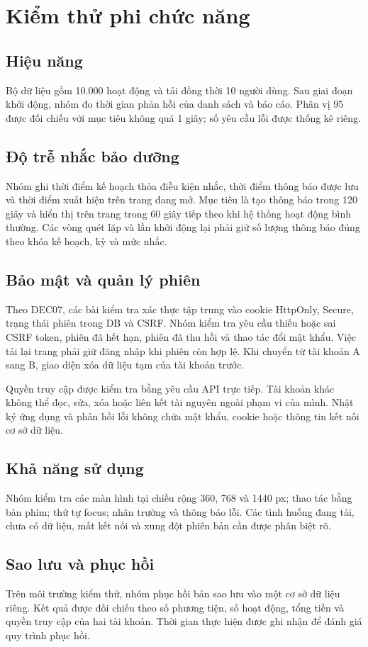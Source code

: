 \section{Kiểm thử phi chức năng}
\subsection{Hiệu năng}
Bộ dữ liệu gồm 10.000 hoạt động và tải đồng thời 10 người dùng. Sau giai đoạn khởi động, nhóm đo thời gian phản hồi của danh sách và báo cáo. Phân vị 95 được đối chiếu với mục tiêu không quá 1 giây; số yêu cầu lỗi được thống kê riêng.

\subsection{Độ trễ nhắc bảo dưỡng}
Nhóm ghi thời điểm kế hoạch thỏa điều kiện nhắc, thời điểm thông báo được lưu và thời điểm xuất hiện trên trang đang mở. Mục tiêu là tạo thông báo trong 120 giây và hiển thị trên trang trong 60 giây tiếp theo khi hệ thống hoạt động bình thường. Các vòng quét lặp và lần khởi động lại phải giữ số lượng thông báo đúng theo khóa kế hoạch, kỳ và mức nhắc.

\subsection{Bảo mật và quản lý phiên}
Theo DEC07, các bài kiểm tra xác thực tập trung vào cookie HttpOnly, Secure, trạng thái phiên trong DB và CSRF. Nhóm kiểm tra yêu cầu thiếu hoặc sai CSRF token, phiên đã hết hạn, phiên đã thu hồi và thao tác đổi mật khẩu. Việc tải lại trang phải giữ đăng nhập khi phiên còn hợp lệ. Khi chuyển từ tài khoản A sang B, giao diện xóa dữ liệu tạm của tài khoản trước.

Quyền truy cập được kiểm tra bằng yêu cầu API trực tiếp. Tài khoản khác không thể đọc, sửa, xóa hoặc liên kết tài nguyên ngoài phạm vi của mình. Nhật ký ứng dụng và phản hồi lỗi không chứa mật khẩu, cookie hoặc thông tin kết nối cơ sở dữ liệu.

\subsection{Khả năng sử dụng}
Nhóm kiểm tra các màn hình tại chiều rộng 360, 768 và 1440 px; thao tác bằng bàn phím; thứ tự focus; nhãn trường và thông báo lỗi. Các tình huống đang tải, chưa có dữ liệu, mất kết nối và xung đột phiên bản cần được phân biệt rõ.

\subsection{Sao lưu và phục hồi}
Trên môi trường kiểm thử, nhóm phục hồi bản sao lưu vào một cơ sở dữ liệu riêng. Kết quả được đối chiếu theo số phương tiện, số hoạt động, tổng tiền và quyền truy cập của hai tài khoản. Thời gian thực hiện được ghi nhận để đánh giá quy trình phục hồi.

